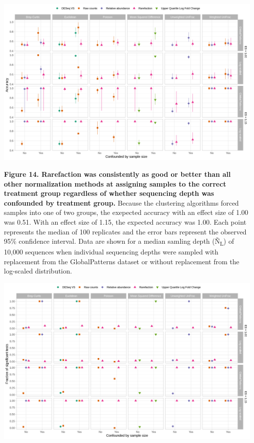 \documentclass[
]{article}
\begin{document}
\newpage

\includegraphics{figure_14.png}

\textbf{Figure 14. Rarefaction was consistently as good or better than
all other normalization methods at assigning samples to the correct
treatment group regardless of whether sequencing depth was confounded by
treatment group.} Because the clustering algorithms forced samples into
one of two groups, the exepected accuracy with an effect size of 1.00
was 0.51. With an effect size of 1.15, the expected accuracy was 1.00.
Each point represents the median of 100 replicates and the error bars
represent the observed 95\% confidence interval. Data are shown for a
median samling depth (Ñ\textsubscript{L}) of 10,000 sequences when
individual sequencing depths were sampled with replacement from the
GlobalPatterns dataset or without replacement from the log-scaled
distribution.

\newpage

\includegraphics{figure_15.png}
\end{document}
